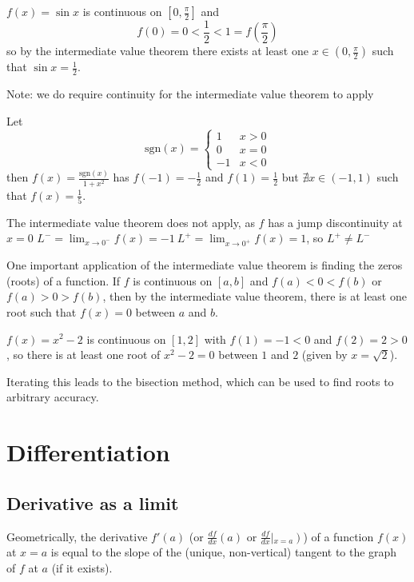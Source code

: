 \documentclass[10pt, a4paper]{article}
\begin{document}
\begin{example}
    $f(x) = \sin x$ is continuous on $\left[0, \frac{\pi}{2}\right]$ and
    \[
    f(0) = 0 < \frac{1}{2} < 1 = f\left(\frac{\pi}{2}\right) 
    \]
    so by the intermediate value theorem there exists at least one $x \in \left(0, \frac{\pi}{2}\right)$ such that $\sin x = \frac{1}{2}$.
\end{example}

Note: we do require continuity for the intermediate value theorem to apply
\begin{example}
    Let \[
    \mathrm{sgn}(x) = \begin{cases}
        1 & x > 0 \\    
        0 & x = 0 \\ 
        -1 & x < 0    
    \end{cases}
    \]
    then $f(x) = \frac{\mathrm{sgn}(x)}{1 + x ^ 2}$ has $f(-1) = -\frac{1}{2}$ and $f(1) = \frac{1}{2}$ but $\nexists x \in (-1, 1)$ such that $f(x) = \frac{1}{5}$.

    The intermediate value theorem does not apply, as $f$ has a jump discontinuity at $x = 0$
    $\displaystyle L ^ - = \lim_{x \rightarrow 0^-}f(x) = -1\ L ^ + = \lim_{x \rightarrow 0^+}f(x) = 1$, so $L^+ \neq L^-$
\end{example}

One important application of the intermediate value theorem is finding the zeros (roots) of a function. If $f$ is continuous on $[a, b]$ and $f(a) < 0 < f(b)$ or $f(a) > 0 > f(b)$, then by the intermediate value theorem, there is at least one root such that $f(x) = 0$ between $a$ and $b$.

\begin{example}
    $f(x) = x ^ 2 - 2$ is continuous on $[1, 2]$ with $f(1) = -1 < 0$ and $f(2) = 2 > 0$, so there is at least one root of $x ^ 2 - 2 = 0$ between $1$ and $2$ (given by $x = \sqrt{2}$).
\end{example}

Iterating this leads to the bisection method, which can be used to find roots to arbitrary accuracy.

\newpage

\section{Differentiation}

\subsection{Derivative as a limit}
Geometrically, the derivative $f'(a)$ (or $\frac{df}{dx}(a)$ or $\frac{df}{dx}\left|_{x = a}\right)$)
of a function $f(x)$ at $x = a$ is equal to the slope of the (unique, non-vertical) tangent to the graph of $f$ at $a$ (if it exists).
\end{document}
